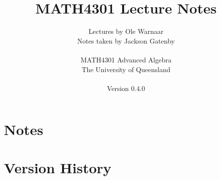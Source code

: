 \documentclass[a4paper]{report}
\title{MATH4301 Lecture Notes}
\author{Lectures by Ole Warnaar\\
Notes taken by Jackson Gatenby\\
\\
MATH4301 Advanced Algebra\\
The University of Queensland\\
\\
Version 0.4.0}
\begin{document}
\maketitle
\tableofcontents



\chapter{Notes}









\appendix

\chapter{Version History}

\end{document}
